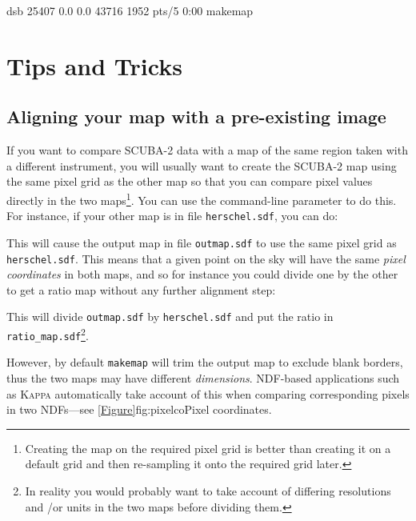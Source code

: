 \begin{terminalv}
\begin{tip}
\begin{terminalv}

dsb      25407  0.0  0.0  43716  1952 pts/5    0:00 makemap

\end{terminalv}

\end{tip}


\section{Tips and Tricks}
\subsection{Aligning your map with a pre-existing image}
If you want to compare SCUBA-2 data with a map of the same region taken
with a different instrument, you will usually want to create the
SCUBA-2 map using the same pixel grid as the other map so that you can
compare pixel values directly in the two maps\footnote{Creating the map on the
required pixel grid is better than creating it on a default grid and then
re-sampling it onto the required grid later.}. You can use the
 command-line parameter to do this. For instance, if your
other map is in file \texttt{herschel.sdf}, you can do:

\begin{terminalv}
\end{terminalv}

This will cause the output map in file \texttt{outmap.sdf} to use
the same pixel grid as \texttt{herschel.sdf}.  This means that a given
point on the sky will have the same \emph{pixel coordinates} in both
maps, and so for instance you could divide one by the other to get a
ratio map without any further alignment step:

\begin{terminalv}
\end{terminalv}

This will divide \texttt{outmap.sdf} by \texttt{herschel.sdf} and put the
ratio in \texttt{ratio\_map.sdf}\footnote{In reality you would probably
want to take account of differing resolutions and /or units in the two
maps before dividing them.}.

However, by default \texttt{makemap} will trim the output map to
exclude blank borders, thus the two maps may have different
\emph{dimensions}. NDF-based applications such as \textsc{Kappa}
 automatically take account of this when
comparing corresponding pixels in two NDFs---see
\cref{Figure}{fig:pixelco}{Pixel coordinates}.


\end{terminalv}
